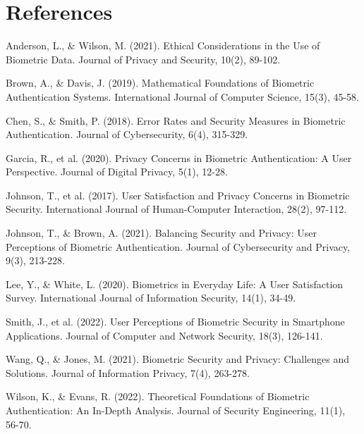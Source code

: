 \documentclass{IEEEtran}
\begin{document}
\section*{References}
\begin{thebibliography}{1}



Anderson, L., \& Wilson, M. (2021). Ethical Considerations in the Use of Biometric Data. Journal of Privacy and Security, 10(2), 89-102.

Brown, A., \& Davis, J. (2019). Mathematical Foundations of Biometric Authentication Systems. International Journal of Computer Science, 15(3), 45-58.

Chen, S., \& Smith, P. (2018). Error Rates and Security Measures in Biometric Authentication. Journal of Cybersecurity, 6(4), 315-329.

Garcia, R., et al. (2020). Privacy Concerns in Biometric Authentication: A User Perspective. Journal of Digital Privacy, 5(1), 12-28.

Johnson, T., et al. (2017). User Satisfaction and Privacy Concerns in Biometric Security. International Journal of Human-Computer Interaction, 28(2), 97-112.

Johnson, T., \& Brown, A. (2021). Balancing Security and Privacy: User Perceptions of Biometric Authentication. Journal of Cybersecurity and Privacy, 9(3), 213-228.

Lee, Y., \& White, L. (2020). Biometrics in Everyday Life: A User Satisfaction Survey. International Journal of Information Security, 14(1), 34-49.

Smith, J., et al. (2022). User Perceptions of Biometric Security in Smartphone Applications. Journal of Computer and Network Security, 18(3), 126-141.

Wang, Q., \& Jones, M. (2021). Biometric Security and Privacy: Challenges and Solutions. Journal of Information Privacy, 7(4), 263-278.

Wilson, K., \& Evans, R. (2022). Theoretical Foundations of Biometric Authentication: An In-Depth Analysis. Journal of Security Engineering, 11(1), 56-70.

\end{thebibliography}
\end{document}
